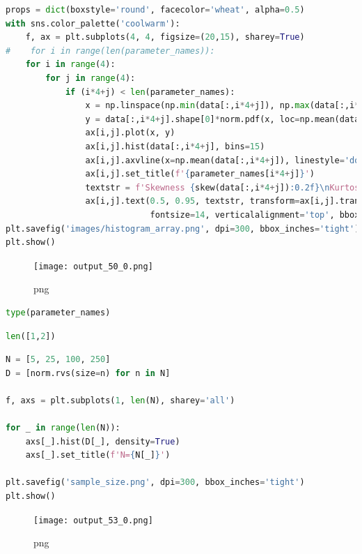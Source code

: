 \begin{lstlisting}[language=Python]
props = dict(boxstyle='round', facecolor='wheat', alpha=0.5)
with sns.color_palette('coolwarm'):
    f, ax = plt.subplots(4, 4, figsize=(20,15), sharey=True)
#    for i in range(len(parameter_names)):
    for i in range(4):
        for j in range(4):
            if (i*4+j) < len(parameter_names):
                x = np.linspace(np.min(data[:,i*4+j]), np.max(data[:,i*4+j]))
                y = data[:,i*4+j].shape[0]*norm.pdf(x, loc=np.mean(data[:,i*4+j]), scale=np.std(data[:,i*4+j]))
                ax[i,j].plot(x, y)
                ax[i,j].hist(data[:,i*4+j], bins=15)
                ax[i,j].axvline(x=np.mean(data[:,i*4+j]), linestyle='dotted')
                ax[i,j].set_title(f'{parameter_names[i*4+j]}')
                textstr = f'Skewness {skew(data[:,i*4+j]):0.2f}\nKurtosis {kurtosis(data[:,i*4+j]):0.2f}'
                ax[i,j].text(0.5, 0.95, textstr, transform=ax[i,j].transAxes,
                             fontsize=14, verticalalignment='top', bbox=props)
plt.savefig('images/histogram_array.png', dpi=300, bbox_inches='tight')
plt.show()
\end{lstlisting}

\begin{figure}
\centering
\texttt{[image: output\_50\_0.png]}
\caption{png}
\end{figure}

\begin{lstlisting}[language=Python]
type(parameter_names)
\end{lstlisting}

\begin{lstlisting}[language=Python]
len([1,2])
\end{lstlisting}

\begin{lstlisting}[language=Python]
N = [5, 25, 100, 250]
D = [norm.rvs(size=n) for n in N]

f, axs = plt.subplots(1, len(N), sharey='all')

for _ in range(len(N)):
    axs[_].hist(D[_], density=True)
    axs[_].set_title(f'N={N[_]}')

plt.savefig('sample_size.png', dpi=300, bbox_inches='tight')
plt.show()
\end{lstlisting}

\begin{figure}
\centering
\texttt{[image: output\_53\_0.png]}
\caption{png}
\end{figure}

\begin{lstlisting}[language=Python]
\end{lstlisting}

